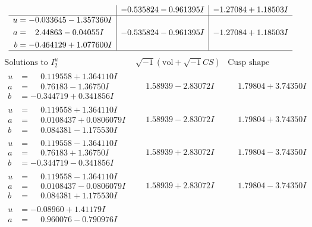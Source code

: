 \documentclass[1p]{elsarticle_modified}
\theoremstyle{definition}
\newcommand{\I}{\sqrt{-1}}
\begin{document}
$$\begin{array}{c|c|c}
 & -0.535824 - 0.961395 I & -1.27084 + 1.18503 I \\ \hline\begin{aligned}
u &= -0.033645 - 1.357360 I \\
a &= \phantom{-}2.44863 - 0.04055 I \\
b &= -0.464129 + 1.077600 I\end{aligned}
 & -0.535824 - 0.961395 I & -1.27084 + 1.18503 I\\
 \hline 
 \end{array}$$\newpage$$\begin{array}{c|c|c}  
\text{Solutions to }I^u_{2}& \I (\text{vol} + \sqrt{-1}CS) & \text{Cusp shape}\\
 \hline 
\begin{aligned}
u &= \phantom{-}0.119558 + 1.364110 I \\
a &= \phantom{-}0.76183 - 1.36750 I \\
b &= -0.344719 + 0.341856 I\end{aligned}
 & \phantom{-}1.58939 - 2.83072 I & \phantom{-}1.79804 + 3.74350 I \\ \hline\begin{aligned}
u &= \phantom{-}0.119558 + 1.364110 I \\
a &= \phantom{-}0.0108437 + 0.0806079 I \\
b &= \phantom{-}0.084381 - 1.175530 I\end{aligned}
 & \phantom{-}1.58939 - 2.83072 I & \phantom{-}1.79804 + 3.74350 I \\ \hline\begin{aligned}
u &= \phantom{-}0.119558 - 1.364110 I \\
a &= \phantom{-}0.76183 + 1.36750 I \\
b &= -0.344719 - 0.341856 I\end{aligned}
 & \phantom{-}1.58939 + 2.83072 I & \phantom{-}1.79804 - 3.74350 I \\ \hline\begin{aligned}
u &= \phantom{-}0.119558 - 1.364110 I \\
a &= \phantom{-}0.0108437 - 0.0806079 I \\
b &= \phantom{-}0.084381 + 1.175530 I\end{aligned}
 & \phantom{-}1.58939 + 2.83072 I & \phantom{-}1.79804 - 3.74350 I \\ \hline\begin{aligned}
u &= -0.08960 + 1.41179 I \\
a &= \phantom{-}0.960076 - 0.790976 I \\

\end{aligned}
\end{array}$$
\end{document}
